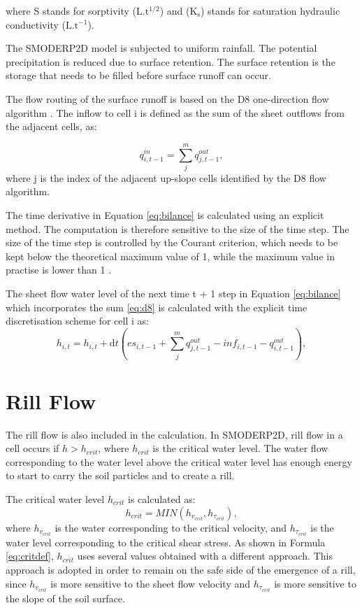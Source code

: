 where S stands for sorptivity ($\mathrm{L.t^{1/2}}$) and ($\mathrm{K_s}$)
stands for saturation hydraulic conductivity ($\mathrm{L.t^{-1}}$).

The SMODERP2D model is subjected to uniform rainfall. The potential
precipitation is reduced due to surface retention. The surface retention is the
storage that needs to be filled before surface runoff can occur. 

The flow routing of the surface runoff is based on the D8 one-direction flow
algorithm \cite{o1984extraction}. The inflow to cell i is defined as the sum of the sheet
outflows from the adjacent cells, as:

\begin{equation} 
q^{in}_{i,t-1} = \sum_j^m q^{out}_{j,t-1}, 
\label{eq:d8}
\end{equation} 
where j is the index of the adjacent up-slope cells identified by the D8 flow
algorithm.

The time derivative in Equation \ref{eq:bilance} is calculated using an
explicit method. The computation is therefore sensitive to the size of the time
step. The size of the time step is controlled by the Courant criterion, which
needs to be kept below the theoretical maximum value of 1, while the maximum
value in practise is lower than 1 
\cite{zhang1989modeling, esteves2000overland}.


The sheet flow water level of the next time t + 1 step in Equation
\ref{eq:bilance} which incorporates the sum \ref{eq:d8} is calculated with the
explicit time discretisation scheme for cell i as:
\begin{equation} 
h_{i,t} =h_{i,t} + \mathrm{d}t (es_{i,t-1} + \sum_j^m q^{out}_{j,t-1}-
inf_{i,t-1} - q^{out}_{i,t-1}),
\label{eq:bilance}
\end{equation}

\section{Rill Flow}

The rill flow is also included in the calculation. In SMODERP2D, rill flow in a
cell occurs if $h>h_{crit}$, where $h_{crit}$ is the critical water level. The
water flow corresponding to the water level above the critical water level has
enough energy to start to carry the soil particles and to create a rill.

The critical water level $h_{crit}$ is calculated as:
\begin{equation}
  h_{crit} = MIN(h_{v_{crit}},h_{\tau_{crit}}),
  \label{eq:critdef}
\end{equation}
where $h_{v_{crit}}$ is the water corresponding to the critical velocity, and
$h_{\tau_{crit}}$ is the water level corresponding to the critical shear
stress.  As shown in Formula \ref{eq:critdef}, $h_{crit}$ uses several values
obtained with a different approach. This approach is adopted in order to remain
on the safe side of the emergence of a rill, since $h_{v_{crit}}$ is more
sensitive to the sheet flow velocity and $h_{\tau_{crit}}$ is more sensitive to
the slope of the soil surface. 

